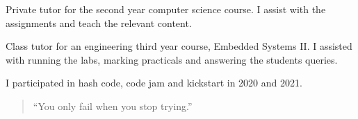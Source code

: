 \documentclass[10pt,a4paper,ragged2e,withhyper]{altacv}
\begin{document}
\begin{paracol}{2}
Private tutor for the second year computer science course. I assist with the assignments and teach the relevant content. 

\divider


Class tutor for an engineering third year course, Embedded Systems II. I assisted with running the labs, marking practicals and answering the students queries.

\divider

I participated in hash code, code jam and kickstart in 2020 and 2021. 








\newpage

\medskip



\switchcolumn


\begin{quote}
``You only fail when you stop trying.''
\end{quote}




\end{paracol}
\end{document}
